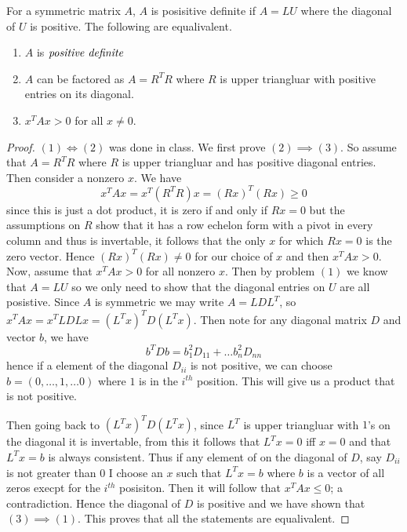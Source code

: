\newpage
\question
For a symmetric matrix $A$, $A$ is posisitive definite if $A = LU$ where the diagonal of $U$ is positive. 
The following are equalivalent. 
\begin{enumerate}
    \item $A$ is $\emph{positive definite}$
    \item $A$ can be factored as $A = R^TR$ where $R$ is upper triangluar with positive entries on its diagonal. 
    \item $x^TAx > 0$ for all $x \neq 0$.
    
\end{enumerate}

\begin{proof}
    $(1) \iff (2)$ was done in class. 
    We first prove $(2) \implies (3)$. So assume that $A = R^TR$ where $R$ is upper triangluar and has positive diagonal entries. 
    Then consider a nonzero $x$. We have 
    \[x^TAx = x^T (R^TR) x = (Rx)^T(Rx) \geq 0\]
    since this is just a dot product, it is zero if and only if $Rx = 0$ but the assumptions on $R$ show that it has a row echelon form  with a pivot in every column and 
    thus is invertable, it follows that the only $x$ for which $Rx = 0$ is the zero vector. Hence $(Rx)^T(Rx) \neq 0$ for our choice of $x$ and then 
    $x^TAx > 0$. Now, assume that $x^TAx > 0$ for all nonzero $x$. Then by problem $(1)$ we know that $A = LU$ so we only need to show that the diagonal entries on $U$ are all posistive. 
    Since $A$ is symmetric we may write $A = LDL^T$, so $x^TAx = x^TL D Lx = (L^Tx)^T D (L^Tx)$. Then note for any diagonal matrix $D$ and vector $b$, we have 
    \[b^TDb = b_1^2 D_{11} + \dots b_n^2 D_{nn}\]
    hence if a element of the diagonal $D_{ii} $ is not positive, we can choose $b = (0, \dots, 1, \dots 0)$ where $1$ is in the $i^{th}$ position. This will give us a product that is not positive. 


    Then going back to  $ (L^Tx)^T D (L^Tx)$, since $L^T$ is upper triangluar with $1$'s on the diagonal it is invertable, from this it follows that $L^Tx = 0$ iff $x = 0$ and that $L^Tx = b$ is always consistent. Thus if any element of on the diagonal 
    of $D$, say $D_{ii}$ is not greater than 
    $0$ I choose an $x$ such that $L^Tx = b$ where $b$ is a vector of all zeros execpt for the $i^{th}$ posisiton. Then it will follow that $x^TAx \leq 0$; a contradiction. Hence the diagonal of $D$ is positive 
    and we have shown that $(3) \implies (1)$. This proves that all the statements are equalivalent. 

\end{proof}


